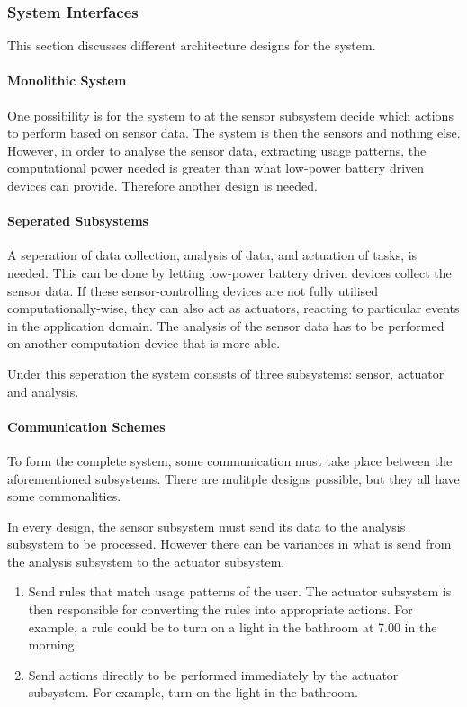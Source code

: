 \subsubsection{System Interfaces}

This section discusses different architecture designs for the system.

\paragraph{Monolithic System}
One possibility is for the system to at the sensor subsystem decide which
actions to perform based on sensor data. The system is then the sensors and
nothing else. However, in order to analyse the sensor data, extracting usage
patterns, the computational power needed is greater than what low-power battery
driven devices can provide. Therefore another design is needed.

\paragraph{Seperated Subsystems}
A seperation of data collection, analysis of data, and actuation of tasks, is
needed. This can be done by letting low-power battery driven devices collect the
sensor data. If these sensor-controlling devices are not fully utilised
computationally-wise, they can also act as actuators, reacting to particular
events in the application domain. The analysis of the sensor data has to be
performed on another computation device that is more able.

Under this seperation the system consists of three subsystems: sensor, actuator
and analysis. 

\paragraph{Communication Schemes}
To form the complete system, some communication must take place
between the aforementioned subsystems. There are mulitple designs possible, but
they all have some commonalities.

In every design, the sensor subsystem must send its data to the analysis
subsystem to be processed. However there can be variances in what is send from
the analysis subsystem to the actuator subsystem.

\begin{enumerate}
\item Send rules that match usage patterns of the user. The actuator subsystem
  is then responsible for converting the rules into appropriate actions. For example, a rule
  could be to turn on a light in the bathroom at 7.00 in the morning.
\item Send actions directly to be performed immediately by the actuator
  subsystem. For example, turn on the light in the bathroom.
\end{enumerate}
